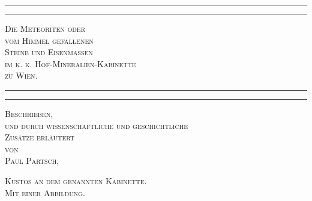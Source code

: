 \documentclass[a4paper, 11pt, oneside, polutonikogreek, german]{article}
\begin{document}
\begin{titlepage} %
	\centering %

	
	\rule{\textwidth}{1.6pt}\vspace*{-\baselineskip}\vspace*{2pt} %
	\rule{\textwidth}{0.4pt} %
	
	\vspace{1\baselineskip} %
	
	{\scshape\LARGE Die Meteoriten oder\\[1.25pt] vom Himmel gefallenen \\[1.25pt] Steine und Eisenmassen\\[1.25pt] im k. k. Hof-Mineralien-Kabinette\\[4pt] zu Wien.}
	
	\vspace{1\baselineskip} %

	\rule{\textwidth}{0.4pt}\vspace*{-\baselineskip}\vspace{3.2pt} %
	\rule{\textwidth}{1.6pt} %
	
	\vspace{1\baselineskip} %
	
	
	{\scshape Beschrieben,\\ und durch wissenschaftliche und geschichtliche \\ Zusätze erläutert \\ von \\ Paul Partsch,} %
	
	\vspace*{1\baselineskip} %
	
    {\scshape\scriptsize Kustos an dem genannten Kabinette. \\ Mit einer Abbildung.} %
    
    \vspace*{\fill}


\end{titlepage}
\end{document}

